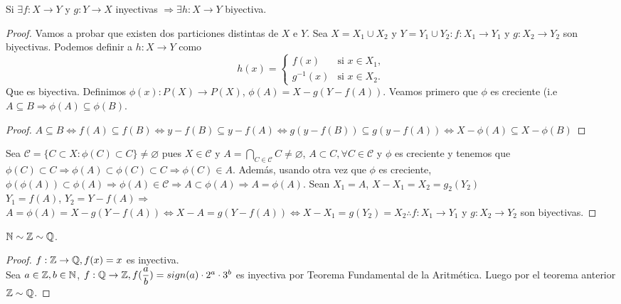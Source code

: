 \begin{theorem}
    Si $\exists f: X \to Y$ y $g: Y \to X$ inyectivas $\Rightarrow \exists h:X \to Y$ biyectiva.

    \begin{proof}
        Vamos a probar que existen dos particiones distintas de $X$ e $Y$. Sea $X = X_1 \cup X_2$ y $Y = Y_1 \cup Y_2 : f: X_1 \to Y_1$ y $g: X_2 \to Y_2$ son biyectivas. Podemos definir a $h: X \to Y$ como \begin{equation} h(x) = \begin{cases}
                f(x)      & \text{si } x \in X_1, \\
                g^{-1}(x) & \text{si } x \in X_2.
            \end{cases}
        \end{equation}
        Que es biyectiva. Definimos $\phi(x):P(X) \to P(X)$, $\phi(A) = X-g(Y-f(A))$. Veamos primero que $\phi$ es creciente (i.e $A \subseteq B \Rightarrow \phi(A) \subseteq \phi(B)$.
        \begin{proof}
            $A \subseteq B \iff f(A) \subseteq f(B) \iff y - f(B) \subseteq y - f(A) \iff g(y-f(B)) \subseteq g(y-f(A)) \iff X - \phi(A) \subseteq X - \phi(B)$
        \end{proof}

        Sea $\mathscr{C} = \{ C \subset X: \phi(C) \subset C \} \neq \varnothing$ pues $X \in \mathscr{C}$ y $A = \bigcap_{C \in \mathscr{C}} C \neq \varnothing$, $A \subset C, \forall C \in \mathscr{C}$ y $\phi$ es creciente y tenemos que $\phi(C) \subset C \Rightarrow \phi(A) \subset \phi(C) \subset C \Rightarrow \phi(C) \in A$. Además, usando otra vez que $\phi$ es creciente, $\phi(\phi(A)) \subset \phi(A) \Rightarrow \phi(A) \in \mathscr{C} \Rightarrow A \subset \phi(A) \Rightarrow A = \phi(A)$.
        Sean $X_1 = A$, $X-X_1=X_2=g_2(Y_2)$ \\
        $Y_1 = f(A)$, $Y_2 = Y - f(A) \Rightarrow$ \\
        $A = \phi(A) = X-g(Y-f(A)) \iff X-A = g(Y-f(A)) \iff X-X_1=g(Y_2) = X_2 \therefore f:X_1 \to Y_1$ y $g: X_2 \to Y_2$ son biyectivas.
    \end{proof}
\end{theorem}

\begin{eg}
    $\mathbb{N} \sim \mathbb{Z} \sim \mathbb{Q}$.
    \begin{proof}
        $f:\mathbb{Z} \to \mathbb{Q}, f(x) = x$ es inyectiva. \\
        Sea $a \in \mathbb{Z}, b \in \mathbb{N}$, $f: \mathbb{Q} \to \mathbb{Z}, f(\dfrac{a}{b})=sign(a) \cdot 2^a \cdot 3^b$ es inyectiva por Teorema Fundamental de la Aritmética. Luego por el teorema anterior $\mathbb{Z} \sim \mathbb{Q}$.
    \end{proof}
\end{eg}

